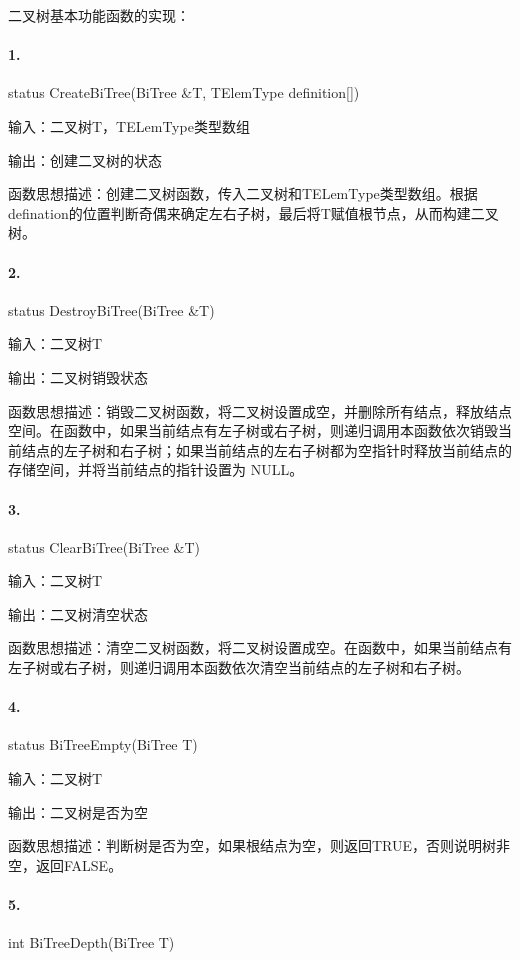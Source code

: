 \documentclass[supercite]{Experimental_Report}
\theoremstyle{definition}
\begin{document}
\setcounter{paragraph}{0}

二叉树基本功能函数的实现：

\paragraph{ 1.} status CreateBiTree(BiTree \&T, TElemType definition[])

输入：二叉树T，TELemType类型数组

输出：创建二叉树的状态

函数思想描述：创建二叉树函数，传入二叉树和TELemType类型数组。根据defination的位置判断奇偶来确定左右子树，最后将T赋值根节点，从而构建二叉树。

\paragraph{ 2.} status DestroyBiTree(BiTree \&T)
    
输入：二叉树T

输出：二叉树销毁状态

函数思想描述：销毁二叉树函数，将二叉树设置成空，并删除所有结点，释放结点空间。在函数中，如果当前结点有左子树或右子树，则递归调用本函数依次销毁当前结点的左子树和右子树；如果当前结点的左右子树都为空指针时释放当前结点的存储空间，并将当前结点的指针设置为 NULL。

\paragraph{ 3.}status ClearBiTree(BiTree \&T)
    
输入：二叉树T

输出：二叉树清空状态

函数思想描述：清空二叉树函数，将二叉树设置成空。在函数中，如果当前结点有左子树或右子树，则递归调用本函数依次清空当前结点的左子树和右子树。

\paragraph{ 4.}status BiTreeEmpty(BiTree T)

输入：二叉树T

输出：二叉树是否为空

函数思想描述：判断树是否为空，如果根结点为空，则返回TRUE，否则说明树非空，返回FALSE。

\paragraph{ 5.}int BiTreeDepth(BiTree T)
\end{document}
